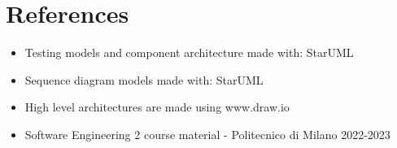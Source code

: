 \section{References}
\begin{itemize}
    \item Testing models and component architecture made with: StarUML
    \item Sequence diagram models made with: StarUML
    \item  High level architectures are made using www.draw.io
    \item Software Engineering 2 course material - Politecnico di Milano 2022-2023


 
\end{itemize}